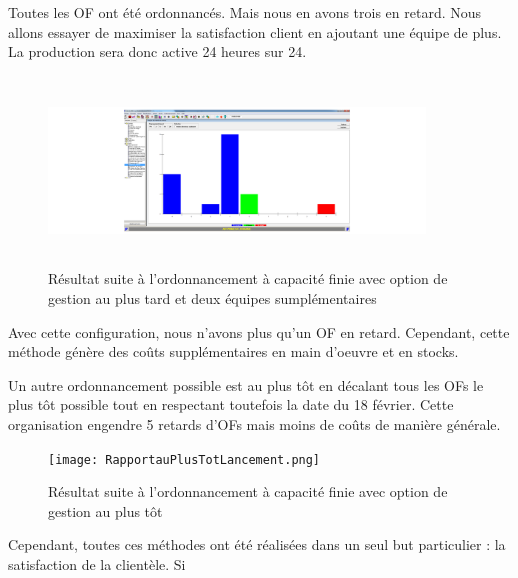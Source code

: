 \documentclass{scrreprt}
\begin{document}
Toutes les OF ont été ordonnancés. Mais nous en avons trois en retard. Nous allons essayer de maximiser la satisfaction client en ajoutant une équipe de plus. La production sera donc active 24 heures sur 24.

\begin{figure}[!h]
\centering
\includegraphics[width=10cm, height=5cm]{2equipeenplus.png}
\caption{Résultat suite à l'ordonnancement à capacité finie avec option de gestion au plus tard et deux équipes sumplémentaires}
\end{figure}

Avec cette configuration, nous n'avons plus qu'un OF en retard. Cependant, cette méthode génère des coûts supplémentaires en main d'oeuvre et en stocks.

Un autre ordonnancement possible est au plus tôt en décalant tous les OFs le plus tôt possible tout en respectant toutefois la date du 18 février. Cette organisation engendre 5 retards d'OFs mais moins de coûts de manière générale.

 \begin{figure}[!h]
\centering
\texttt{[image: RapportauPlusTotLancement.png]}
\caption{Résultat suite à l'ordonnancement à capacité finie avec option de gestion au plus tôt}
\end{figure}

Cependant, toutes ces méthodes ont été réalisées dans un seul but particulier : 
la satisfaction de la clientèle. Si 
\end{document}
